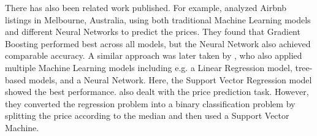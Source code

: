 There has also been related work published. For example, \citet{cai2019} analyzed Airbnb listings in Melbourne, Australia, using both traditional Machine Learning models and different Neural Networks to predict the prices. They found that Gradient Boosting performed best across all models, but the Neural Network also achieved comparable accuracy. 
A similar approach was later taken by \citet{rezazadeh2021}, who also applied multiple Machine Learning models including e.g. a Linear Regression model, tree-based models, and a Neural Network. Here, the Support Vector Regression model showed the best performance.
\citet{tang2015} also dealt with the price prediction task. However, they converted the regression problem into a binary classification problem by splitting the price according to the median and then used a Support Vector Machine.  
























